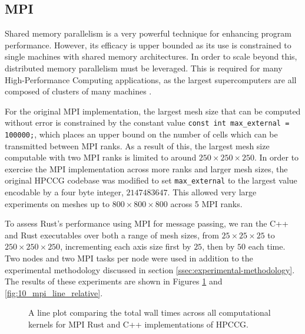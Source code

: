 \subsection{MPI}
\label{ssec:mpi}

Shared memory parallelism is a very powerful technique for enhancing program performance. However, its efficacy is upper bounded as its use is constrained to single machines with shared memory architectures. In order to scale beyond this, distributed memory parallelism must be leveraged. This is required for many High-Performance Computing applications, as the largest supercomputers are all composed of clusters of many machines \cite{HomeTOP500}.

For the original MPI implementation, the largest mesh size that can be computed without error is constrained by the constant value \texttt{const int max_external = 100000;}, which places an upper bound on the number of cells which can be transmitted between MPI ranks. As a result of this, the largest mesh size computable with two MPI ranks is limited to around $250 \times 250 \times 250$. In order to exercise the MPI implementation across more ranks and larger mesh sizes, the original HPCCG codebase was modified to set \texttt{max_external} to the largest value encodable by a four byte integer, $2147483647$. This allowed very large experiments on meshes up to $800 \times 800 \times 800$ across 5 MPI ranks.

To assess Rust's performance using MPI for message passing, we ran the C++ and Rust executables over both a range of mesh sizes, from $25 \times 25 \times 25$ to $250 \times 250 \times 250$, incrementing each axis size first by $25$, then by $50$ each time. Two nodes and two MPI tasks per node were used in addition to the experimental methodology discussed in section \ref{ssec:experimental-methodology}. The results of these experiments are shown in Figures \ref{fig:9_mpi_line} and \ref{fig:10_mpi_line_relative}.


\begin{figure}[H]
    \centering
    
    \caption{A line plot comparing the total wall times across all computational kernels for MPI Rust and C++ implementations of HPCCG.}
    \label{fig:9_mpi_line}
\end{figure}

